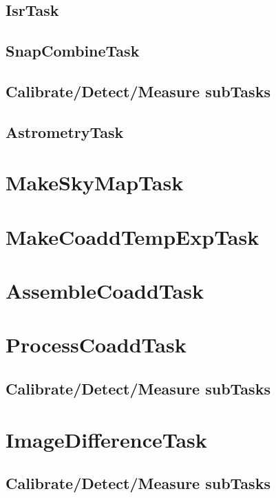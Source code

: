 \documentclass[12pt]{article}
\begin{document}
\subsection{IsrTask}
\subsection{SnapCombineTask}
\subsection{Calibrate/Detect/Measure subTasks}
\subsection{AstrometryTask} 


\clearpage 
\section{MakeSkyMapTask} 


\clearpage 
\section{MakeCoaddTempExpTask} 


\clearpage 
\section{AssembleCoaddTask} 


\clearpage 
\section{ProcessCoaddTask} 
\subsection{Calibrate/Detect/Measure subTasks}


\clearpage 
\section{ImageDifferenceTask} 
\subsection{Calibrate/Detect/Measure subTasks}
\end{document}
